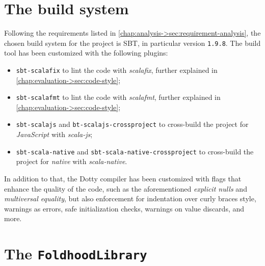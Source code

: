\section{The build system}

Following the requirements listed in \cref{chap:analysis->sec:requirement-analysis}, the chosen build system for the project is \ac{SBT}, in particular version \texttt{1.9.8}.
%
The build tool has been customized with the following plugins:
\begin{itemize}
    \item \texttt{sbt-scalafix} to lint the code with \textit{scalafix}, further explained in \cref{chap:evaluation->sec:code-style};
    \item \texttt{sbt-scalafmt} to lint the code with \textit{scalafmt}, further explained in \cref{chap:evaluation->sec:code-style};
    \item \texttt{sbt-scalajs} and \texttt{bt-scalajs-crossproject} to cross-build the project for \textit{JavaScript} with \textit{scala-js};
    \item \texttt{sbt-scala-native} and \texttt{sbt-scala-native-crossproject} to cross-build the project for \textit{native} with \textit{scala-native}.
\end{itemize}
%
In addition to that, the Dotty compiler has been customized with flags that enhance the quality of the code, such as the aforementioned \textit{explicit nulls} and \textit{multiversal equality}, but also enforcement for indentation over curly braces style, warnings as errors, safe initialization checks, warnings on value discards, and more.

\section{The \texttt{FoldhoodLibrary}}

